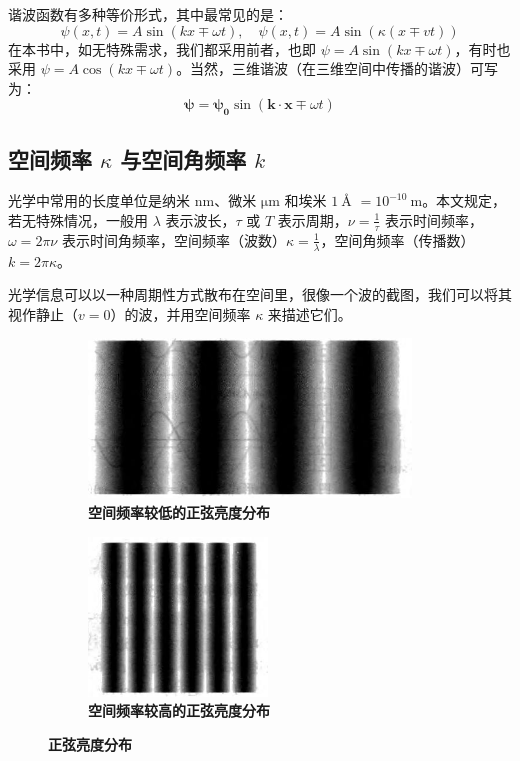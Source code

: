 \documentclass[UTF8]{report}
\theoremstyle{MyLineTheoremStyle} %
\theoremstyle{MyBlockTheoremStyle} %
\theoremstyle{MySubsubsectionStyle} %
\begin{document}
谐波函数有多种等价形式，其中最常见的是：
\begin{equation}
    \psi(x,t)=A\sin(kx\mp\omega t) ,\quad \psi(x,t)=A\sin \left(  \kappa (x\mp vt) \right)
\end{equation}
在本书中，如无特殊需求，我们都采用前者，也即 $\psi = A\sin(kx\mp\omega t)$，有时也采用 $\psi = A\cos(kx\mp\omega t)$。当然，三维谐波（在三维空间中传播的谐波）可写为：
\begin{equation}
    \boldsymbol{\psi}=\boldsymbol{\psi_0}\sin(\boldsymbol{k}\cdot \boldsymbol{x} \mp \omega t)
\end{equation}

\subsection{空间频率 $\kappa$ 与空间角频率 $k$}

光学中常用的长度单位是纳米 $\mathrm{nm}$、微米 $\mathrm{\mu m}$ 和埃米 $1\ \si{\angstrom}$ $ = 10^{-10}\ \mathrm{m}$。本文规定，若无特殊情况，一般用 $\lambda$ 表示波长，$\tau $ 或 $T$ 表示周期，$\nu = \frac{1}{\tau}$ 表示时间频率，$\omega = 2\pi\nu$ 表示时间角频率，空间频率（波数）$\kappa = \frac{1}{\lambda}$，空间角频率（传播数）$k = 2\pi \kappa$。

光学信息可以以一种周期性方式散布在空间里，很像一个波的截图，我们可以将其视作静止（$v=0$）的波，并用空间频率 $\kappa$ 来描述它们。

\begin{figure}[H]\centering
\begin{subfigure}[t]{0.62\columnwidth}\centering
    \includegraphics[height=120pt]{assets/1,2/image (41).jpg}
    \caption{\bfseries 空间频率较低的正弦亮度分布 }
\end{subfigure}\begin{subfigure}[t]{0.37\columnwidth}\centering
    \includegraphics[height=120pt]{assets/1,2/image (42).jpg}
    \caption{\bfseries 空间频率较高的正弦亮度分布 }
\end{subfigure}
\caption{\bfseries 正弦亮度分布 }
\end{figure}
\end{document}

